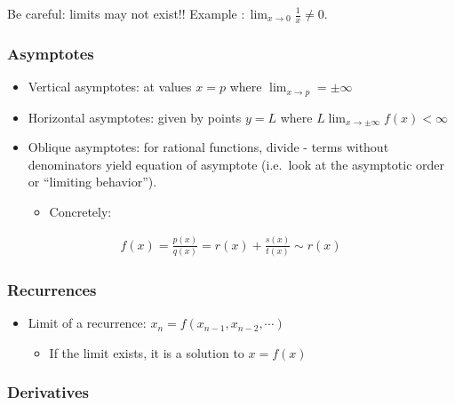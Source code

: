 \begin{warning}

Be careful: limits may not exist!! Example
\(:\lim_{x\to 0} \frac{1}{x} \neq 0\).

\end{warning}

\hypertarget{asymptotes}{%
\subsubsection{Asymptotes}\label{asymptotes}}

\begin{itemize}
\tightlist
\item
  Vertical asymptotes: at values \(x=p\) where
  \(\lim_{x\to p} = \pm\infty\)
\item
  Horizontal asymptotes: given by points \(y=L\) where
  \(L \lim_{x\to\pm\infty} f(x) < \infty\)
\item
  Oblique asymptotes: for rational functions, divide - terms without
  denominators yield equation of asymptote (i.e.~look at the asymptotic
  order or ``limiting behavior'').

  \begin{itemize}
  \tightlist
  \item
    Concretely:
  \end{itemize}
\end{itemize}

\begin{align*}
f(x) = \frac{p(x)}{q(x)} = r(x) + \frac{s(x)}{t(x)} \sim r(x)
\end{align*}

\hypertarget{recurrences}{%
\subsubsection{Recurrences}\label{recurrences}}

\begin{itemize}
\tightlist
\item
  Limit of a recurrence: \(x_n = f(x_{n-1}, x_{n-2}, \cdots)\)

  \begin{itemize}
  \tightlist
  \item
    If the limit exists, it is a solution to \(x = f(x)\)
  \end{itemize}
\end{itemize}

\hypertarget{derivatives}{%
\subsubsection{Derivatives}\label{derivatives}}

